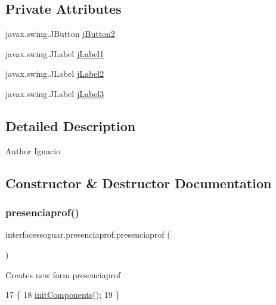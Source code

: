 \subsection*{Private Attributes}
\begin{DoxyCompactItemize}
\item 
javax.\+swing.\+J\+Button \mbox{\hyperlink{classinterfacessoguar_1_1presenciaprof_a18f5bfde2ab11a4dc2cbf168d7d12cfd}{j\+Button2}}
\item 
javax.\+swing.\+J\+Label \mbox{\hyperlink{classinterfacessoguar_1_1presenciaprof_ad2eecc0bf28ea2305d1008b07e796236}{j\+Label1}}
\item 
javax.\+swing.\+J\+Label \mbox{\hyperlink{classinterfacessoguar_1_1presenciaprof_a48151227c574caee1cc79ec5af3ec825}{j\+Label2}}
\item 
javax.\+swing.\+J\+Label \mbox{\hyperlink{classinterfacessoguar_1_1presenciaprof_a4f3e97efdda0f378c637202970533e22}{j\+Label3}}
\end{DoxyCompactItemize}


\subsection{Detailed Description}
\begin{DoxyAuthor}{Author}
Ignacio 
\end{DoxyAuthor}


\subsection{Constructor \& Destructor Documentation}
\mbox{\label{classinterfacessoguar_1_1presenciaprof_a9e4f31169325b49b5313434193252dff}} 
\subsubsection{\texorpdfstring{presenciaprof()}{presenciaprof()}}
{\footnotesize\ttfamily interfacessoguar.\+presenciaprof.\+presenciaprof (\begin{DoxyParamCaption}{ }\end{DoxyParamCaption})\hspace{0.3cm}{\ttfamily [inline]}}

Creates new form presenciaprof 
\begin{DoxyCode}
17                            \{
18         \mbox{\hyperlink{classinterfacessoguar_1_1presenciaprof_a4bf8f354badc97d4f80931e90dd84113}{initComponents}}();
19     \}
\end{DoxyCode}


